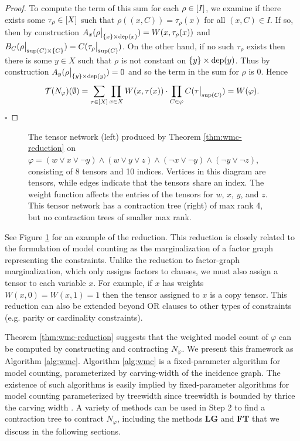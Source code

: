 \begin{proof}
To compute the term of this sum for each $\rho \in [I]$, we examine if there exists some $\tau_\rho \in [X]$ such that $\rho((x, C)) = \tau_\rho(x)$ for all $(x, C) \in I$. If so, then by construction $A_x(\rho\big|_{\{x\} \times \text{dep}(x)}) = W(x, \tau_\rho(x))$ and $B_C(\rho\big|_{\text{sup}(C) \times \{C\}}) = C(\tau_\rho\big|_{\text{sup}(C)})$. On the other hand, if no such $\tau_\rho$ exists then there is some $y \in X$ such that $\rho$ is not constant on $\{y\} \times \text{dep}(y)$. Thus by construction $A_y(\rho\big|_{\{y\} \times \text{dep}(y)}) = 0$ and so the term in the sum for $\rho$ is 0. Hence
$$\mathcal{T}(N_\varphi)(\emptyset) = \sum_{\tau \in [X]} \prod_{x \in X} W(x, \tau(x)) \cdot \prod_{C \in \varphi} C(\tau\big|_{\text{sup}(C)}) = W(\varphi).$$\hfill$\square$
\end{proof}

\begin{figure}[t]
	\centering
	
	\hspace{1cm}
	
	\caption{\label{fig:wmc-example} The tensor network (left) produced by Theorem \ref{thm:wmc-reduction} on $\varphi = (w \lor x \lor \neg y) \land (w \lor y \lor z) \land (\neg x \lor \neg y) \land (\neg y \lor \neg z)$, consisting of 8 tensors and 10 indices. Vertices in this diagram are tensors, while edges indicate that the tensors share an index. The weight function affects the entries of the tensors for $w$, $x$, $y$, and $z$. This tensor network has a contraction tree (right) of max rank 4, but no contraction trees of smaller max rank.}
\end{figure}

See Figure \ref{fig:wmc-example} for an example of the reduction. This reduction is closely related to the formulation of model counting as the marginalization of a factor graph representing the constraints. Unlike the reduction to factor-graph marginalization, which only assigns factors to clauses, we must also assign a tensor to each variable $x$. For example, if $x$ has weights $W(x, 0) = W(x,1) = 1$ then the tensor assigned to $x$ is a copy tensor. This reduction can also be extended beyond OR clauses to other types of constraints (e.g. parity or cardinality constraints). 

Theorem \ref{thm:wmc-reduction} suggests that the weighted model count of $\varphi$ can be computed by constructing and contracting $N_\varphi$. We present this framework as Algorithm \ref{alg:wmc}. Algorithm \ref{alg:wmc} is a fixed-parameter algorithm for model counting, parameterized by carving-width of the incidence graph. The existence of such algorithms is easily implied by fixed-parameter algorithms for model counting parameterized by treewidth \cite{FMR08,SS10} since treewidth is bounded by thrice the carving width \cite{sasak10}. A variety of methods can be used in Step 2 to find a contraction tree to contract $N_\varphi$, including the methods \textbf{LG} and \textbf{FT} that we discuss in the following sections.

